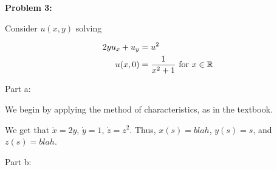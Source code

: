 \documentclass[a4paper,12pt]{article}
\begin{document}
{\bf Problem 3:}

Consider $u(x,y)$ solving

\begin{align*}
2yu_x + u_y &= u^2\\
u(x,0)&= \frac{1}{x^2+1} \text{ for } x \in \mathbb{R}
\end{align*}

Part a:

We begin by applying the method of characteristics, as in the textbook.

We get that $\dot{x} = 2y$, $\dot{y} = 1$, $\dot{z} = z^2$. Thus, $x(s) = blah$, $y(s) = s$, and $z(s) = blah$. %

\shunt

Part b:

\shunt
\end{document}
